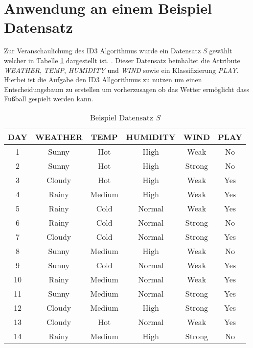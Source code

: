 \section{Anwendung an einem Beispiel Datensatz}
\label{id3:datensatz}
Zur Veranschaulichung des ID3 Algorithmus wurde ein Datensatz \textit{S} gewählt welcher in Tabelle \ref{table:datensatz-original} dargestellt ist. \Autocite{ImplementationID3}. Dieser Datensatz beinhaltet die Attribute \textit{WEATHER}, \textit{TEMP}, \textit{HUMIDITY} und \textit{WIND} sowie ein Klassifizierung \textit{PLAY}.\\
Hierbei ist die Aufgabe den ID3 Allgorithmus zu nutzen um einen Entscheidungsbaum zu erstellen um vorherzusagen ob das Wetter ermöglicht dass Fußball gespielt werden kann.

\begin{table}[htbp]
    \centering
    \begin{tabular}{cccccc}
        \toprule
        \textbf{DAY} & \textbf{WEATHER} & \textbf{TEMP} & \textbf{HUMIDITY} & \textbf{WIND} & \textbf{PLAY} \\
        \toprule
        1   &Sunny	&Hot	&High	&Weak	&No  \\
        2   &Sunny	&Hot	&High	&Strong	&No  \\
        3   &Cloudy	&Hot	&High	&Weak	&Yes \\
        4   &Rainy	&Medium	&High	&Weak	&Yes \\
        5   &Rainy	&Cold	&Normal	&Weak	&Yes \\
        6   &Rainy	&Cold	&Normal	&Strong	&No  \\
        7   &Cloudy	&Cold	&Normal	&Strong	&Yes \\
        8   &Sunny	&Medium	&High	&Weak	&No  \\
        9   &Sunny	&Cold	&Normal	&Weak	&Yes \\
        10  &Rainy	&Medium	&Normal	&Weak	&Yes \\
        11  &Sunny	&Medium	&Normal	&Strong	&Yes \\
        12  &Cloudy	&Medium	&High	&Strong	&Yes \\
        13  &Cloudy	&Hot	&Normal	&Weak	&Yes \\
        14  &Rainy	&Medium	&High	&Strong	&No  \\
        \bottomrule
    \end{tabular}
    \caption{Beispiel Datensatz \textit{S}}
    \label{table:datensatz-original}
\end{table}

